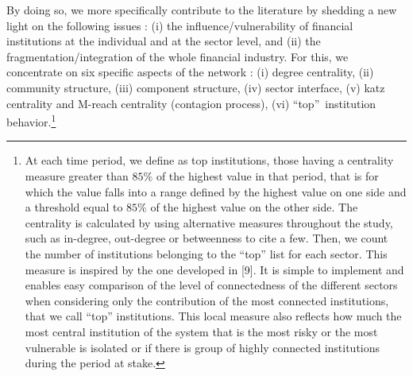 \documentclass[a4paper,10pt]{article}
\begin{document}
By doing so, we more specifically contribute to the literature by  shedding a new light on  the following issues : (i) the 
influence/vulnerability of financial institutions at the individual  and at the sector  level, and (ii) the
fragmentation/integration of the whole financial industry. For this, we concentrate on six specific aspects of the network :
(i) degree centrality, (ii) community structure, (iii) component structure, (iv) sector interface, (v) katz centrality and 
M-reach centrality (contagion process), (vi) \textquotedblleft top\textquotedblright\  institution behavior.\footnote{
At each time period, we define as top institutions, those having a centrality measure greater than $85 \%$ of the highest	
value in that period, that is for which the value falls into a range defined by the highest value on one side and a threshold 
equal to $85\%$ of the highest value on the other side. The centrality is calculated by using alternative measures throughout
the study, such as in-degree, out-degree or betweenness to cite a few. Then, we count the number of institutions belonging to 
the “top” list for each sector. This measure is inspired by the one developed in [9]. It is simple to implement and enables
easy comparison of the level of connectedness of the different sectors when considering only the contribution of the most 
connected institutions, that we call “top” institutions. This local measure also reflects how much the most central 
institution of the system that is the most risky or the most vulnerable is isolated or if there is group of highly connected
institutions during the period at stake.}
 
\end{document}
